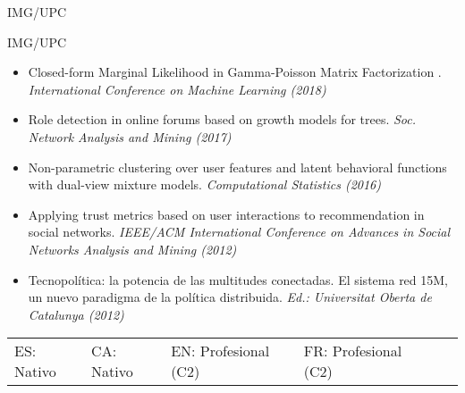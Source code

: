\documentclass[paper=a4,fontsize=11pt]{temp} %
\begin{document}
\sepspace

 {IMG/UPC}

\sepspace

 {IMG/UPC}

\sepspace
\vspace{-0.5cm}

\begin{itemize}
\item Closed-form Marginal Likelihood in Gamma-Poisson Matrix Factorization
. \textit{International Conference on Machine Learning (2018)}
\item Role detection in online forums based on growth models for trees. \textit{Soc. Network Analysis and Mining (2017)}
\item Non-parametric clustering over user features and latent behavioral functions with dual-view mixture models. \textit{Computational Statistics (2016)}
\item Applying trust metrics based on user interactions to recommendation in social networks. \textit{IEEE/ACM International Conference on Advances in Social Networks Analysis and Mining (2012)} 
\item Tecnopolítica: la potencia de las multitudes conectadas. El sistema red 15M, un nuevo paradigma de la política distribuida. \textit{Ed.: Universitat Oberta de Catalunya (2012)}
\end{itemize}

\vspace{-0.5cm}
\hspace{3mm}
\begin{minipage}[t]{0.7\textwidth} 

\begin{tabular}[t]{ l l l l l l }
ES: Nativo& \quad
CA: Nativo&
EN: Profesional (C2)&
FR: Profesional (C2)\\
\end{tabular}
\sepspace
\end{minipage}
\end{document}
